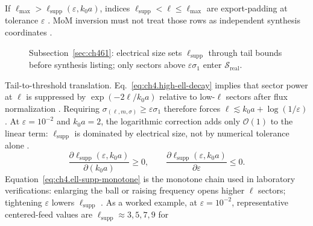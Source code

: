 \label{cor:ch4.listing-vs-supported}
If \(\ell_{\max}>\ell_{\mathrm{supp}}(\varepsilon,k_{0}a)\), indices \(\ell_{\mathrm{supp}}<\ell\le\ell_{\max}\) are export-padding at
tolerance \(\varepsilon\) \cite{hansen1988}. MoM inversion must not treat those rows as independent synthesis
coordinates \cite{harrington2001}.
\begin{figure}[t]
\centering
{}
\caption{Subsection~\ref{sec:ch461}: electrical size sets \(\ell_{\mathrm{supp}}\) through tail bounds before synthesis listing; only
sectors above \(\varepsilon\sigma_{1}\) enter \(\mathcal{S}_{\mathrm{real}}\).}
\label{fig:ch4.ell-max-supported}
\end{figure}
Tail-to-threshold translation. Eq.~\eqref{eq:ch4.high-ell-decay} implies that sector power at \(\ell\) is suppressed by \(\exp(-2\ell/k_{0}a)\) relative to low-\(\ell\)
sectors after flux normalization \cite{hansen1988}. Requiring \(\sigma_{(\ell,m,\sigma)}\ge\varepsilon\sigma_{1}\) therefore
forces \(\ell\lesssim k_{0}a+\log(1/\varepsilon)\) \cite{stratton1941}. At \(\varepsilon=10^{-2}\) and \(k_{0}a=2\), the logarithmic
correction adds only \(\mathcal{O}(1)\) to the linear term: \(\ell_{\mathrm{supp}}\) is dominated by electrical size, not by numerical tolerance alone
\cite{harrington2001}.
\begin{equation}
\label{eq:ch4.ell-supp-monotone}
\frac{\partial\ell_{\mathrm{supp}}(\varepsilon,k_{0}a)}{\partial(k_{0}a)}\ge0,\qquad
\frac{\partial\ell_{\mathrm{supp}}(\varepsilon,k_{0}a)}{\partial\varepsilon}\le0.
\end{equation}
Equation~\eqref{eq:ch4.ell-supp-monotone} is the monotone chain used in laboratory verifications: enlarging the ball or raising frequency opens
higher \(\ell\) sectors; tightening \(\varepsilon\) lowers \(\ell_{\mathrm{supp}}\) \cite{hansen1988}.
As a worked example, at \(\varepsilon=10^{-2}\), representative centered-feed values are \(\ell_{\mathrm{supp}}\approx3,5,7,9\) for
